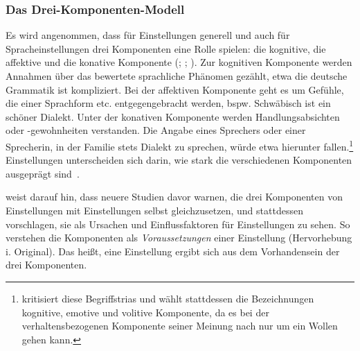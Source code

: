 \subsubsection{Das Drei-Komponenten-Modell}
\label{sec:Komponenten}
Es wird angenommen, dass für Einstellungen generell und auch für Spracheinstellungen drei Komponenten eine Rolle spielen: die kognitive, die affektive und die konative Komponente (\citealp[s.][242--244]{Ajzen1989}; \citealp[221]{Cargile.1994}; \citealp[200]{Jonas.2014}). 
Zur kognitiven Komponente werden Annahmen über das bewertete sprachliche Phänomen gezählt, etwa \grq die deutsche Grammatik ist kompliziert\grq. 
Bei der affektiven Komponente geht es um Gefühle, die einer Sprachform etc. entgegengebracht werden, bspw. \grq Schwäbisch ist ein schöner Dialekt\grq. 
Unter der konativen Komponente werden Handlungsabsichten oder -gewohnheiten verstanden. Die Angabe eines Sprechers oder einer Sprecherin, in der Familie stets Dialekt zu sprechen, würde etwa hierunter fallen.\footnote{\citet[65--66, 76--77]{Hermanns.2002} kritisiert diese Begriffstrias und w{\"a}hlt stattdessen die Bezeichnungen kognitive, emotive und volitive Komponente, da es bei der verhaltensbezogenen Komponente seiner Meinung nach nur um ein Wollen gehen kann.} Einstellungen unterscheiden sich darin, wie stark die verschiedenen Komponenten ausgeprägt sind~\citep[s.][218]{Aronson.2014}.

\citet[23]{Garrett.2012} weist darauf hin, dass neuere Studien davor warnen, die drei Komponenten von Einstellungen mit Einstellungen selbst gleichzusetzen, und stattdessen vorschlagen, sie als Ursachen und Einflussfaktoren f{\"u}r Einstellungen zu sehen. So verstehen \citet[198]{Jonas.2014} die Komponenten als \glqq \textit{Voraussetzungen} einer Einstellung\grqq{} (Hervorhebung i. Original).  
Das heißt, eine Einstellung ergibt sich aus dem Vorhandensein der drei Komponenten.

